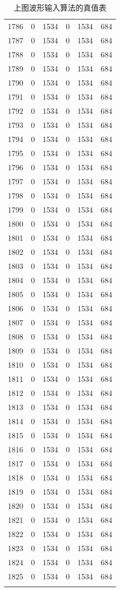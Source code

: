 \documentclass[a4paper]{ctexart}
\begin{document}
\begin{longtable}{p{1cm}|p{2cm}|p{2cm}|p{2cm}|P{2cm}|p{2cm}}
		1786&0&1534&0&1534&684\\
		1787&0&1534&0&1534&684\\
		1788&0&1534&0&1534&684\\
		1789&0&1534&0&1534&684\\
		1790&0&1534&0&1534&684\\
		1791&0&1534&0&1534&684\\
		1792&0&1534&0&1534&684\\
		1793&0&1534&0&1534&684\\
		1794&0&1534&0&1534&684\\
		1795&0&1534&0&1534&684\\
		1796&0&1534&0&1534&684\\
		1797&0&1534&0&1534&684\\
		1798&0&1534&0&1534&684\\
		1799&0&1534&0&1534&684\\
		1800&0&1534&0&1534&684\\
		1801&0&1534&0&1534&684\\
		1802&0&1534&0&1534&684\\
		1803&0&1534&0&1534&684\\
		1804&0&1534&0&1534&684\\
		1805&0&1534&0&1534&684\\
		1806&0&1534&0&1534&684\\
		1807&0&1534&0&1534&684\\
		1808&0&1534&0&1534&684\\
		1809&0&1534&0&1534&684\\
		1810&0&1534&0&1534&684\\
		1811&0&1534&0&1534&684\\
		1812&0&1534&0&1534&684\\
		1813&0&1534&0&1534&684\\
		1814&0&1534&0&1534&684\\
		1815&0&1534&0&1534&684\\
		1816&0&1534&0&1534&684\\
		1817&0&1534&0&1534&684\\
		1818&0&1534&0&1534&684\\
		1819&0&1534&0&1534&684\\
		1820&0&1534&0&1534&684\\
		1821&0&1534&0&1534&684\\
		1822&0&1534&0&1534&684\\
		1823&0&1534&0&1534&684\\
		1824&0&1534&0&1534&684\\
		1825&0&1534&0&1534&684\\
		
		\caption{上图波形输入算法的真值表}
	\end{longtable}
\end{document}
